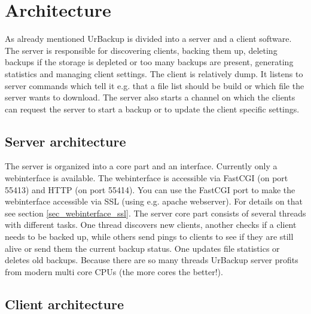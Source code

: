 \documentclass[a4paper,10pt]{article}
\begin{document}
\section{Architecture}
\label{sec_architecture}

As already mentioned UrBackup is divided into a server and a client software. The server is responsible for discovering clients, backing them up, deleting backups if the storage is depleted or too many backups are present, generating statistics and managing client settings. The client is relatively dump. It listens to server commands which tell it e.g. that a file list should be build or which file the server wants to download. The server also starts a channel on which the clients can request the server to start a backup or to update the client specific settings. 

\subsection{Server architecture}

The server is organized into a core part and an interface. Currently only a webinterface is available. The webinterface is accessible via FastCGI (on port 55413) and HTTP (on port 55414). You can use the FastCGI port to make the webinterface accessible via SSL (using e.g. apache webserver). For details on that see section \ref{sec_webinterface_ssl}. The server core part consists of several threads with different tasks. One thread discovers new clients, another checks if a client needs to be backed up, while others send pings to clients to see if they are still alive or send them the current backup status. One updates file statistics or deletes old backups. Because there are so many threads UrBackup server profits from modern multi core CPUs (the more cores the better!). 

\subsection{Client architecture}
\end{document}
